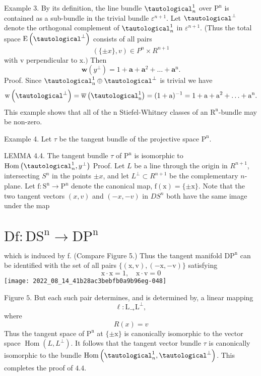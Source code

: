 \documentclass[10pt]{article}
\begin{document}
Example 3. By its definition, the line bundle $\tautological_{n}^{1}$ over $\mathrm{P}^{\mathrm{n}}$ is contained as a sub-bundle in the trivial bundle $\varepsilon^{n+1}$. Let $\tautological^{\perp}$ denote the orthogonal complement of $\tautological_{n}^{1}$ in $\varepsilon^{n+1}$. (Thus the total space $\mathrm{E}\left(\tautological^{\perp}\right)$ consists of all pairs
$$
(\{\pm x\}, v) \in P^{n} \times R^{n+1}
$$
with $\mathrm{v}$ perpendicular to $\mathrm{x} .)$ Then
$$
\mathbf{w}\left(y^{\perp}\right)=1+\mathbf{a}+\mathbf{a}^{2}+\ldots+\mathbf{a}^{\mathrm{n}} .
$$
Proof. Since $\tautological_{\mathrm{n}}^{1} \oplus \tautological^{\perp}$ is trivial we have
$$
\mathrm{w}\left(\tautological^{\perp}\right)=\overline{\mathrm{w}}\left(\tautological_{\mathrm{n}}^{1}\right)=(1+\mathrm{a})^{-1}=1+\mathrm{a}+\mathrm{a}^{2}+\ldots+\mathrm{a}^{\mathrm{n}} .
$$
This example shows that all of the $\mathrm{n}$ Stiefel-Whitney classes of an $\mathrm{R}^{\mathrm{n}}$-bundle may be non-zero.

Example 4. Let $\tau$ be the tangent bundle of the projective space $\mathrm{P}^{\mathrm{n}}$.

LEMMA 4.4. The tangent bundle $\tau$ of $\mathrm{P}^{\mathrm{n}}$ is isomorphic to $\operatorname{Hom}\left(\tautological_{n}^{1}, y^{\perp}\right)$ Proof. Let $L$ be a line through the origin in $R^{n+1}$, intersecting $S^{n}$ in the points $\pm x$, and let $L^{\perp} \subset R^{n+1}$ be the complementary $n$-plane. Let $\mathrm{f}: \mathrm{S}^{\mathrm{n}} \rightarrow \mathrm{P}^{\mathrm{n}}$ denote the canonical map, $\mathrm{f}(\mathrm{x})=\{\pm \mathrm{x}\}$. Note that the two tangent vectors $(x, v)$ and $(-x,-v)$ in $D S^{n}$ both have the same image under the map

\section{$\mathrm{Df}: \mathrm{DS}^{\mathrm{n}} \rightarrow \mathrm{DP}^{\mathrm{n}}$}
which is induced by f. (Compare Figure 5.) Thus the tangent manifold $\mathrm{DP}^{\mathrm{n}}$ can be identified with the set of all pairs $\{(\mathrm{x}, \mathrm{v}),(-\mathrm{x},-\mathrm{v})\}$ satisfying
$$
\mathrm{x} \cdot \mathrm{x}=1, \quad \mathrm{x} \cdot \mathrm{v}=0
$$
\texttt{[image: 2022\_08\_14\_41b28ac3bebfb0a9b96eg-048]}

Figure $5 .$ But each such pair determines, and is determined by, a linear mapping
$$
\ell: \mathrm{L}_{\rightarrow} \mathrm{L}^{\perp},
$$
where
$$
R(x)=v
$$
Thus the tangent space of $\mathrm{P}^{\mathrm{n}}$ at $\{\pm \mathrm{x}\}$ is canonically isomorphic to the vector space $\operatorname{Hom}\left(L, L^{\perp}\right)$. It follows that the tangent vector bundle $\tau$ is canonically isomorphic to the bundle $\operatorname{Hom}\left(\tautological_{n}^{1}, \tautological^{\perp}\right)$. This completes the proof of $4.4$.
\end{document}
